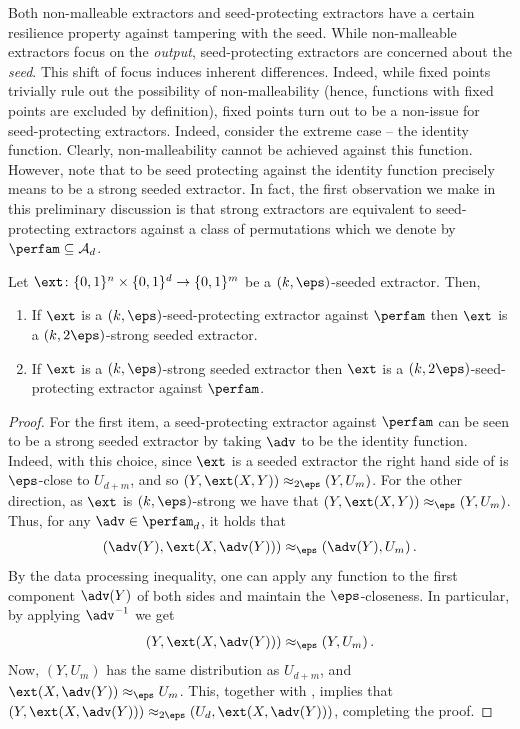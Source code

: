 \documentclass{toc}
\begin{document}
Both non-malleable extractors and seed-protecting extractors have a certain resilience property against tampering %
with  %
the seed. While non-malleable extractors focus on the \emph{output}, seed-protecting extractors are concerned about the \emph{seed}. This shift of focus induces inherent differences. Indeed, while fixed points trivially rule out the possibility of non-malleability (hence, functions with fixed points are excluded by definition), fixed points turn out to be a non-issue for seed-protecting extractors.  Indeed, consider the extreme case -- the identity function. Clearly, non-malleability cannot be achieved against this function. However, note that to be seed protecting against the identity function precisely means to be a strong seeded extractor. In fact, the first observation we make in this preliminary discussion is that strong extractors are equivalent to seed-protecting extractors against
%
a class of permutations %
which we denote by $\perfam \subseteq \mathcal{A}_d$. %

%
\begin{claim}\label{c:intro strong sp}
Let $\ext \colon \{0,1\}^n \times \{0,1\}^d \to \{0,1\}^m$ be a $(k,\eps)$-seeded extractor. Then,
	\begin{enumerate}
		\item  If $\ext$ is a $(k,\eps)$-seed-protecting extractor against $\perfam$ then $\ext$ is a $(k,2\eps)$-strong seeded extractor.
		\item  If $\ext$ is a $(k,\eps)$-strong seeded extractor then $\ext$ is a $(k,2\eps)$-seed-protecting extractor against $\perfam$.
	\end{enumerate}
\end{claim}
\begin{proof}
  For the first item, a seed-protecting extractor against $\perfam$ can be seen to be a strong %
seeded extractor   %
by taking $\adv$ to be the identity function. Indeed, with this choice, since $\ext$ is
a 
%
seeded extractor   %
the right hand side of  is $\eps$-close to $U_{d+m}$, and so $(Y,\ext(X,Y)) \approx_{2\eps} (Y,U_m)$. 	For the other direction, as $\ext$ is $(k,\eps)$-strong we have that $(Y,\ext(X,Y)) \approx_\eps (Y,U_m)$. Thus, for any $\adv \in \perfam_d$, it holds that 
	$$(\adv(Y),\ext(X,\adv(Y))) \approx_\eps (\adv(Y),U_m)\,.$$
	By the data processing inequality, one can apply any function to the first component $\adv(Y)$ of both sides and maintain the $\eps$-closeness. In particular, by applying $\adv^{-1}$ we get 
	\begin{equation}\label{eq:12221121211}
	(Y,\ext(X,\adv(Y))) \approx_\eps (Y,U_m)\,.
	\end{equation}
	Now, $(Y,U_m)$ has the same distribution as $U_{d+m}$, and $\ext(X,\adv(Y)) \approx_\eps U_m$. This, together with , implies that $(Y,\ext(X,\adv(Y))) \approx_{2\eps} (U_d,\ext(X,\adv(Y)))$, completing the proof.
\end{proof}
\end{document}

